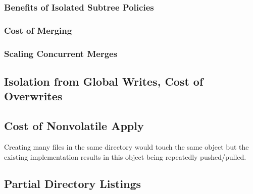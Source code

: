 \subsubsection{Benefits of Isolated Subtree Policies}

\subsubsection{Cost of Merging}
\subsubsection{Scaling Concurrent Merges}



\subsection{Isolation from Global Writes, Cost of Overwrites}
\subsection{Cost of Nonvolatile Apply}
Creating many files in the same directory would touch the same object but the
existing implementation results in this object being repeatedly pushed/pulled.


\subsection{Partial Directory Listings}
